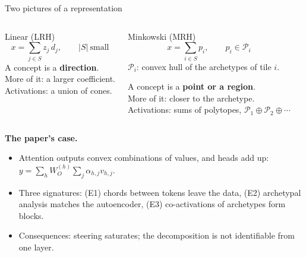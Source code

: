 \documentclass[aspectratio=169,10pt]{beamer}
\newcommand{\msum}{\oplus}
\newcommand{\cP}{\mathcal{P}}
\begin{document}
\begin{frame}{Two pictures of a representation}
  \begin{columns}[T,onlytextwidth]
    \begin{block}{Linear (LRH)}
      \[ x=\sum_{j\in S} z_j\,d_j,\qquad |S|\ \text{small} \]
      A concept is a \textbf{direction}.\\ More of it: a larger coefficient.\\ Activations: a union of cones.
    \end{block}
    \begin{block}{Minkowski (MRH)}
      \[ x=\sum_{i\in S} p_i,\qquad p_i\in\cP_i \]
      {\small $\cP_i$: convex hull of the archetypes of tile $i$.}\par\smallskip
      A concept is a \textbf{point or a region}.\\ More of it: closer to the archetype.\\
      Activations: sums of polytopes, $\cP_1\msum\cP_2\msum\cdots$
    \end{block}
  \end{columns}
  \bigskip
  \textbf{The paper's case.}
  \begin{itemize}
    \item Attention outputs convex combinations of values, and heads add up:
    $y=\sum_h W_O^{(h)}\sum_j \alpha_{h,j}v_{h,j}$.
    \item Three signatures: (E1) chords between tokens leave the data, (E2) archetypal analysis matches the
    autoencoder, (E3) co-activations of archetypes form blocks.
    \item Consequences: steering saturates; the decomposition is not identifiable from one layer.
  \end{itemize}
\end{frame}
\end{document}
